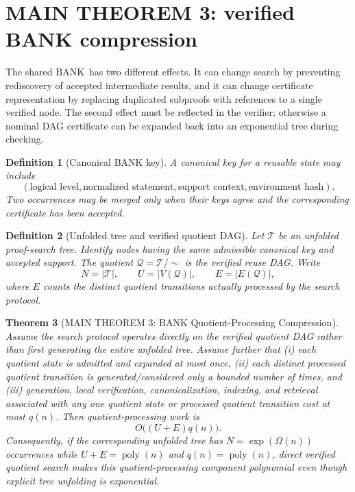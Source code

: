 \documentclass[11pt]{article}
\newtheorem{definition}{Definition}[section]
\newtheorem{theorem}[definition]{Theorem}
\theoremstyle{remark}
\newcommand{\BANK}{\ensuremath{\mathrm{BANK}}}
\begin{document}
\section{MAIN THEOREM 3: verified BANK compression}

The shared \BANK\ has two different effects. It can change search by preventing rediscovery of accepted intermediate results, and it can change certificate representation by replacing duplicated subproofs with references to a single verified node. The second effect must be reflected in the verifier; otherwise a nominal DAG certificate can be expanded back into an exponential tree during checking.

\begin{definition}[Canonical BANK key]
A canonical key for a reusable state may include
\[
(\text{logical level},\text{normalized statement},\text{support context},\text{environment hash}).
\]
Two occurrences may be merged only when their keys agree and the corresponding certificate has been accepted.
\end{definition}

\begin{definition}[Unfolded tree and verified quotient DAG]
Let $\mathcal T$ be an unfolded proof-search tree. Identify nodes having the same admissible canonical key and accepted support. The quotient $\mathcal Q=\mathcal T/{\sim}$ is the verified reuse DAG. Write
\[
N=|\mathcal T|,\qquad U=|V(\mathcal Q)|,\qquad E=|E(\mathcal Q)|,
\]
where $E$ counts the distinct quotient transitions actually processed by the search protocol.
\end{definition}

\begin{theorem}[MAIN THEOREM 3: BANK Quotient-Processing Compression]
Assume the search protocol operates directly on the verified quotient DAG rather than first generating the entire unfolded tree. Assume further that (i) each quotient state is admitted and expanded at most once, (ii) each distinct processed quotient transition is generated/considered only a bounded number of times, and (iii) generation, local verification, canonicalization, indexing, and retrieval associated with any one quotient state or processed quotient transition cost at most $q(n)$. Then quotient-processing work is
\[
O\!\bigl((U+E)q(n)\bigr).
\]
Consequently, if the corresponding unfolded tree has $N=\exp(\Omega(n))$ occurrences while $U+E=\operatorname{poly}(n)$ and $q(n)=\operatorname{poly}(n)$, direct verified quotient search makes this quotient-processing component polynomial even though explicit tree unfolding is exponential.
\end{theorem}
\end{document}

